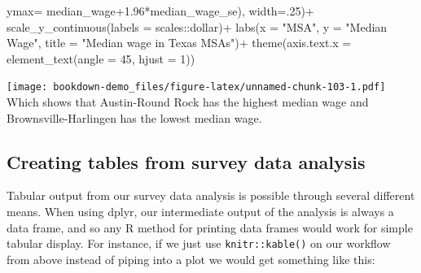 \documentclass[
]{article}
\newenvironment{Shaded}{\begin{snugshade}}{\end{snugshade}}
\newcommand{\AttributeTok}[1]{\textcolor[rgb]{0.77,0.63,0.00}{#1}}
\newcommand{\DecValTok}[1]{\textcolor[rgb]{0.00,0.00,0.81}{#1}}
\newcommand{\FloatTok}[1]{\textcolor[rgb]{0.00,0.00,0.81}{#1}}
\newcommand{\FunctionTok}[1]{\textcolor[rgb]{0.00,0.00,0.00}{#1}}
\newcommand{\NormalTok}[1]{#1}
\newcommand{\SpecialCharTok}[1]{\textcolor[rgb]{0.00,0.00,0.00}{#1}}
\newcommand{\StringTok}[1]{\textcolor[rgb]{0.31,0.60,0.02}{#1}}
\begin{document}
\begin{Shaded}
\begin{Highlighting}[]
                    \AttributeTok{ymax=}\NormalTok{ median\_wage}\FloatTok{+1.96}\SpecialCharTok{*}\NormalTok{median\_wage\_se),}
                \AttributeTok{width=}\NormalTok{.}\DecValTok{25}\NormalTok{)}\SpecialCharTok{+}
  \FunctionTok{scale\_y\_continuous}\NormalTok{(}\AttributeTok{labels =}\NormalTok{ scales}\SpecialCharTok{::}\NormalTok{dollar)}\SpecialCharTok{+}
  \FunctionTok{labs}\NormalTok{(}\AttributeTok{x =} \StringTok{"MSA"}\NormalTok{, }
       \AttributeTok{y =} \StringTok{"Median Wage"}\NormalTok{,}
       \AttributeTok{title =} \StringTok{"Median wage in Texas MSAs"}\NormalTok{)}\SpecialCharTok{+}
  \FunctionTok{theme}\NormalTok{(}\AttributeTok{axis.text.x =} \FunctionTok{element\_text}\NormalTok{(}\AttributeTok{angle =} \DecValTok{45}\NormalTok{, }\AttributeTok{hjust =} \DecValTok{1}\NormalTok{))}
\end{Highlighting}
\end{Shaded}

\texttt{[image: bookdown-demo\_files/figure-latex/unnamed-chunk-103-1.pdf]}
Which shows that Austin-Round Rock has the highest median wage and Brownsville-Harlingen has the lowest median wage.

\hypertarget{creating-tables-from-survey-data-analysis}{%
\subsection{Creating tables from survey data analysis}\label{creating-tables-from-survey-data-analysis}}

Tabular output from our survey data analysis is possible through several different means. When using dplyr, our intermediate output of the analysis is always a data frame, and so any R method for printing data frames would work for simple tabular display. For instance, if we just use \texttt{knitr::kable()} on our workflow from above instead of piping into a plot we would get something like this:
\end{document}
